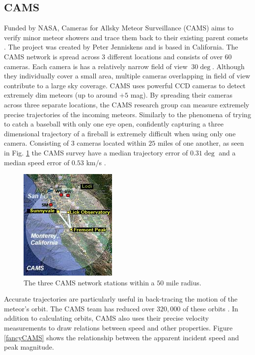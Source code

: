 \subsection{CAMS}
Funded by NASA, Cameras for Allsky Meteor Surveillance (CAMS) aims to verify minor meteor showers and trace them back to their existing parent comets \cite{jenniskens_cams:_2011}.  
The project was created by Peter Jenniskens and is based in California.  
The CAMS network is spread across 3 different locations and consists of over 60 cameras.
Each camera is has a relatively narrow field of view $~30\deg$.
Although they individually cover a small area, multiple cameras overlapping in field of view contribute to a large sky coverage. 
CAMS uses powerful CCD cameras to detect extremely dim meteors (up to around $+5$ mag).
By spreading their cameras across three separate locations, the CAMS research group can measure extremely precise trajectories of the incoming meteors. 
Similarly to the phenomena of trying to catch a baseball with only one eye open, confidently capturing a three dimensional trajectory of a fireball is extremely difficult when using only one camera.
Consisting of $3$ cameras located within $25$ miles of one another, as seen in Fig. \ref{trio} the CAMS survey have a median trajectory error of $0.31\deg$ and a median speed error of $0.53$ km/s \cite{jenniskens_cams:_2011}. 

\begin{figure}[ht!]
  \centering
  \includegraphics[scale=0.7]{images/CAMS_trio.jpg}
  \caption{The three CAMS network stations within a $50$ mile radius.}
  \label{trio}
\end{figure}

Accurate trajectories are particularly useful in back-tracing the motion of the meteor's orbit.  
The CAMS team has reduced over $320,000$ of these orbits \cite{noauthor_cameras_nodate}. 
In addition to calculating orbits, CAMS also uses their precise velocity measurements to draw relations between speed and other properties. 
Figure \ref{fancyCAMS} shows the relationship between the apparent incident speed and peak magnitude.

